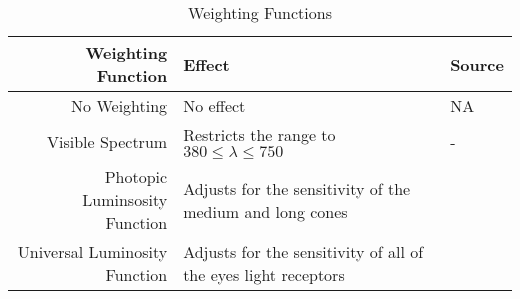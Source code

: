 

\begin{table}
\centering %
\caption{Weighting Functions}
\begin{tabular}{r l l}
  \toprule
  Weighting Function & Effect & Source \\
  \midrule
  No Weighting  
      & No effect
      & NA \\
  Visible Spectrum
      & Restricts the range to $380 \le \lambda \le 750$
      & - \\
  Photopic Luminsosity Function
      & Adjusts for the sensitivity of the medium and long cones
      & \cite{CVRL2008} \\
  Universal Luminosity Function
      & Adjusts for the sensitivity of all of the eyes light receptors
      & \cite{Rea2018}\\
  \bottomrule
\end{tabular}
\label{tab:wfs}
\end{table}

